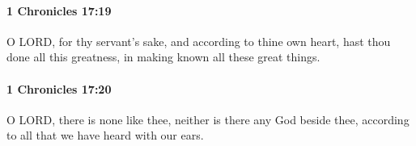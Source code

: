 		\paragraph{1 Chronicles 17:19} %
			\label{1CHRONICLES-17-19}

			O LORD, for thy servant’s sake, and according to thine own heart, hast thou done all this greatness, in making known all these great things.


		\paragraph{1 Chronicles 17:20} %
			\label{1CHRONICLES-17-20}

			O LORD, there is none like thee, neither is there any God beside thee, according to all that we have heard with our ears.


